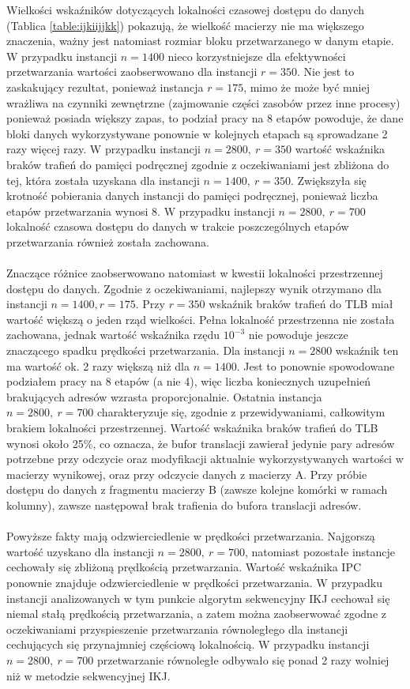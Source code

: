 \documentclass[12pt,a4paper]{article}
\begin{document}
Wielkości wskaźników dotyczących lokalności czasowej dostępu do danych (Tablica \ref{table:ijkiijjkk}) pokazują, że wielkość macierzy nie ma większego znaczenia, ważny jest natomiast rozmiar bloku przetwarzanego w danym etapie. W przypadku instancji $n=1400$ nieco korzystniejsze dla efektywności przetwarzania wartości zaobserwowano dla instancji $r=350$. Nie jest to zaskakujący rezultat, ponieważ instancja $r=175$, mimo że może być mniej wrażliwa na czynniki zewnętrzne (zajmowanie części zasobów przez inne procesy) ponieważ posiada większy zapas, to podział pracy na 8 etapów powoduje, że dane bloki danych wykorzystywane ponownie w kolejnych etapach są sprowadzane 2 razy więcej razy. W przypadku instancji $n=2800,~r=350$ wartość wskaźnika braków trafień do pamięci podręcznej zgodnie z oczekiwaniami jest zbliżona do tej, która została uzyskana dla instancji $n=1400,~r=350$. Zwiększyła się krotność pobierania danych instancji do pamięci podręcznej, ponieważ liczba etapów  przetwarzania wynosi 8. W przypadku instancji $n=2800,~r=700$ lokalność czasowa dostępu do danych w trakcie poszczególnych etapów przetwarzania również została zachowana.\\
\\
Znaczące różnice zaobserwowano natomiast w kwestii lokalności przestrzennej dostępu do danych. Zgodnie z oczekiwaniami, najlepszy wynik otrzymano dla instancji $n=1400, r=175$. Przy $r=350$ wskaźnik braków trafień do TLB miał wartość większą o jeden rząd wielkości. Pełna lokalność przestrzenna nie została zachowana, jednak wartość wskaźnika rzędu $10^{-3}$ nie powoduje jeszcze znaczącego spadku prędkości przetwarzania. Dla instancji $n=2800$ wskaźnik ten ma wartość ok. 2 razy większą niż dla $n=1400$. Jest to ponownie spowodowane podziałem pracy na 8 etapów (a nie 4), więc liczba koniecznych uzupełnień brakujących adresów wzrasta proporcjonalnie.
Ostatnia instancja $n=2800,~r=700$ charakteryzuje się, zgodnie z przewidywaniami, całkowitym brakiem lokalności przestrzennej. Wartość wskaźnika braków trafień do TLB wynosi około 25\%, co oznacza, że bufor translacji zawierał jedynie pary adresów potrzebne przy odczycie oraz modyfikacji aktualnie wykorzystywanych wartości w macierzy wynikowej, oraz przy odczycie danych z macierzy A. Przy próbie dostępu do danych z fragmentu macierzy B (zawsze kolejne komórki w ramach kolumny), zawsze następował brak trafienia do bufora translacji adresów.\\
\\
Powyższe fakty mają odzwierciedlenie w prędkości przetwarzania. Najgorszą wartość uzyskano dla instancji $n=2800,~r=700$, natomiast pozostałe instancje cechowały się zbliżoną prędkością przetwarzania. Wartość wskaźnika IPC ponownie znajduje odzwierciedlenie w prędkości przetwarzania. W przypadku instancji analizowanych w tym punkcie algorytm sekwencyjny IKJ cechował się niemal stałą prędkością przetwarzania, a zatem można zaobserwować zgodne z oczekiwaniami przyspieszenie przetwarzania równoległego dla instancji cechujących się przynajmniej częściową lokalnością. W przypadku instancji $n=2800,~r=700$ przetwarzanie równoległe odbywało się ponad 2 razy wolniej niż w metodzie sekwencyjnej IKJ.\\
\end{document}
